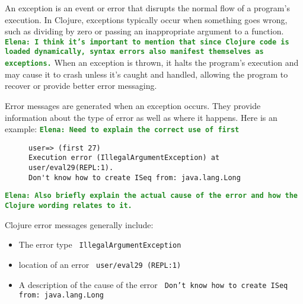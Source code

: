 \documentclass[12pt]{article}
\newcommand{\comment}[1]{{\bf \tt  {#1}}}
\newcommand{\emcomment}[1]{\textcolor{ForestGreen}{\comment{Elena: {#1}}}}
\begin{document}
    An exception is an event or error that disrupts the normal flow of a program's execution. In Clojure,
	exceptions typically occur when something goes wrong, such as dividing by zero or passing an inappropriate argument to a function. \emcomment{I think it's important to mention that since Clojure code is loaded dynamically, syntax errors also manifest themselves as exceptions.}
	When an exception is thrown, it halts the program's execution and may cause it to crash unless it's caught and handled, allowing the program to recover or provide better error messaging.

	Error messages are generated when an exception occurs. They provide information about the type of error as well as where it happens. Here is an example: \emcomment{Need to explain the correct use of first}
	\begin{figure}[h]
		\centering
		\begin{lstlisting}[breaklines=true, basicstyle=\ttfamily]
user=> (first 27)
Execution error (IllegalArgumentException) at user/eval29(REPL:1).  
Don't know how to create ISeq from: java.lang.Long
		\end{lstlisting}
	\end{figure}
\emcomment{Also briefly explain the actual cause of the error and how the Clojure wording relates to it.}	

	Clojure error messages generally include: 
	\begin{itemize}
		\item The error type \texttt{ IllegalArgumentException}
		\item location of an error \texttt{ user/eval29 (REPL:1)}
		\item A description of the cause of the error \texttt{ Don't know how to create ISeq from: java.lang.Long}
	\end{itemize}
\end{document}
